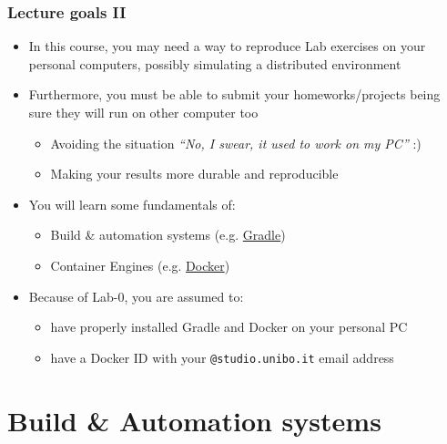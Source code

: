 \documentclass[handout]{beamer}\mode<presentation>{\usetheme{AMSCesenaBleu}}
\begin{document}
\begin{frame}
\frametitle{Lecture goals II}
    
    \begin{itemize}
        \item<1> In this course, you may need a way to reproduce Lab exercises on your personal computers, possibly simulating a distributed environment
        
        \vfill{}
        
        \item<2> Furthermore, you must be able to submit your homeworks/projects being sure they will run on other computer too
        \begin{itemize}
            \item<2> Avoiding the situation \emph{``No, I swear, it used to work on my PC''} :)
            
            \item<2>[!] Making your results more durable and \alert{reproducible}
        \end{itemize}
        
        \vfill{}
        
        \item<3>[$\rightarrow$] You will learn some fundamentals of:
        \begin{itemize}
            \item<3> Build \& automation systems (e.g. \href{https://gradle.org/}{Gradle})
            \item<3> Container Engines (e.g. \href{https://www.docker.com/}{Docker})
        \end{itemize}
        
        \vfill{}
        
        \item<4> Because of Lab-0, you are assumed to:
        \begin{itemize}
            \item<4> have properly installed Gradle and Docker on your personal PC
            \item<4> have a Docker ID with your \texttt{@studio.unibo.it} email address
        \end{itemize}
    \end{itemize}

\end{frame}

\section{Build \& Automation systems}
\end{document}
